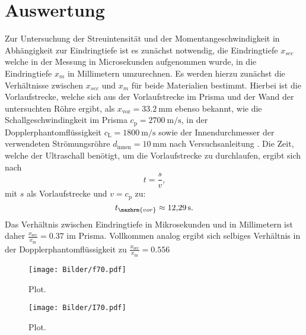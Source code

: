 \section{Auswertung}
\label{sec:Auswertung}





Zur Untersuchung der Streuintensität und der Momentangeschwindigkeit in Abhängigkeit zur Eindringtiefe ist es zunächst notwendig, die Eindringtiefe $x_{sec}$ welche in der Messung in Microsekunden aufgenommen wurde, in die Eindringtiefe $x_{m}$ in Millimetern umzurechnen.
Es werden hierzu zunächst die Verhältnisse zwischen $x_{sec}$ und $x_{m}$ für beide Materialien bestimmt.
Hierbei ist die Vorlaufstrecke, welche sich aus der Vorlaufstrecke im Prisma und der Wand der untersuchten Röhre ergibt, als $x_\mathrm{vor}=\SI{33.2}{\milli\meter}$ ebenso bekannt, wie die Schallgeschwindingkeit im Prisma $c_\mathrm{p}=\SI{2700}{\meter\per\second}$, in der Dopplerphantomflüssigkeit $c_\mathrm{L}=\SI{1800}{\meter\per\second}$ sowie der Innendurchmesser der verwendeten Strömungsröhre $d_\mathrm{innen}=\SI{10}{\milli\meter}$ nach Versuchsanleitung \cite{Anleitung}.
Die Zeit, welche der Ultraschall benötigt, um die Vorlaufstrecke zu durchlaufen, ergibt sich nach
\begin{equation*}
  t=\frac{s}{v} \text{,}
\end{equation*}
mit $s$ als Vorlaufstrecke und $v=c_\mathrm{p}$ zu:
\begin{equation*}
    t_\mazhrm{vor}\approx\SI{12.29}{\second}\text{.}
\end{equation*}
Das Verhältnis zwischen Eindringtiefe in Mikrosekunden und in Millimetern ist daher $\frac{x_\mathrm{sec}}{x_\mathrm{m}}=0.37$ im Prisma. Vollkommen analog ergibt sich selbiges Verhältnis in der Dopplerphantomflüssigkeit zu $\frac{x_\mathrm{sec}}{x_\mathrm{m}}=0.556$
\begin{figure}
  \centering
  \texttt{[image: Bilder/f70.pdf]}
  \caption{Plot.}
  \label{fig:f70}
\end{figure}
\begin{figure}
  \centering
  \texttt{[image: Bilder/I70.pdf]}
  \caption{Plot.}
  \label{fig:I70}
\end{figure}


